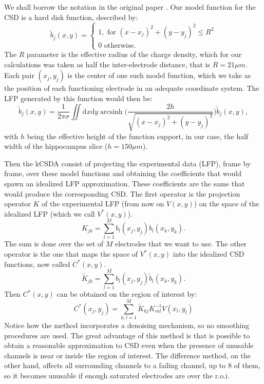 \documentclass{article}
\DeclareMathOperator{\arcsinh}{arcsinh}
\newcommand{\rd}{\mathrm{d}}
\begin{document}
We shall borrow the notation in the original paper \cite{Potworowski2011}. Our model function for the CSD is a hard disk function, described by:
\begin{equation}
  \tilde{b}_j(x,y)=\begin{cases}
  1, \text{ for } (x-x_j)^2+(y-y_j)^2 \leq R^2 \\
  0 \text{ otherwise.} 
  \end{cases}
\end{equation}
The $R$ parameter is the effective radius of the charge density, which for our
calculations was taken as half the inter-electrode distance, that is $R=21 \mu m$.
Each pair $(x_j, y_j)$ is the center of one such model function, which we take as
the position of each  functioning electrode in an adequate coordinate system.
The LFP generated by this function would then be:
\begin{equation}
  \tilde{b}_j(x,y)=\frac{1}{2\pi\sigma}
  \iint \! \rd x \rd y \arcsinh \biggr(
  \frac{2 h } {\sqrt{(x-x_j)^2+(y-y_j)^2}}
  \biggl)
  \tilde{b}_j(x,y),
\end{equation}
  with $h$ being the effective height of the function support, in our case,
  the half width of the hippocampus slice ($h=150 \mu m$).

Then the kCSDA consist of projecting the experimental data (LFP), frame by frame,
over these model functions and obtaining the  coefficients that would spawn an idealized
LFP approximation. These coefficients are the same that would produce the
corresponding CSD. The first operator is the projection operator $K$ of the experimental
LFP (from now on $V(x,y)$) on the space of the idealized LFP (which we call $V^* (x,y)$).
\begin{equation}
  K_{jk}=\sum_{l=1}^{M}b_l(x_j,y_j)b_l(x_k,y_k).
\end{equation}
The sum is done over the set of $M$ electrodes that we want to use.
The other operator is the one that maps the space of $V^*(x,y)$ into the idealized
CSD functions, now called $C^*(x,y)$. 
\begin{equation}
  \tilde{K}_{jk}=\sum_{l=1}^Mb_l(x_j,y_j)\tilde{b}_l(x_k,y_k).
\end{equation}
Then $C^*(x,y)$ can be obtained on the region of interest by:
\begin{equation}
  C^*(x_j,y_j)=\sum_{k,l=1}^M \tilde{K}_{kj} K^{-1}_{ml} V(x_l,y_l)
\end{equation}
Notice how the method incorporates a denoising mechanism, so
no smoothing procedures are used.
The great advantage of this method is that is possible to obtain a reasonable
approximation to CSD even when the presence of unusable channels is near or inside
the region of interest. The difference method, on the other hand, affects all surrounding
channels to a failing channel, up to 8 of them, so it becomes unusable if enough
saturated electrodes are over the r.o.i.
\end{document}
